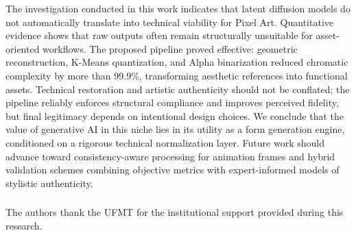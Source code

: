 \documentclass[runningheads]{llncs}
\begin{document}
The investigation conducted in this work indicates that latent diffusion models do not automatically translate into technical viability for Pixel Art. Quantitative evidence shows that raw outputs often remain structurally unsuitable for asset-oriented workflows. The proposed pipeline proved effective: geometric reconstruction, K-Means quantization, and Alpha binarization reduced chromatic complexity by more than 99.9\%, transforming aesthetic references into functional assets. Technical restoration and artistic authenticity should not be conflated; the pipeline reliably enforces structural compliance and improves perceived fidelity, but final legitimacy depends on intentional design choices. We conclude that the value of generative AI in this niche lies in its utility as a form generation engine, conditioned on a rigorous technical normalization layer. Future work should advance toward consistency-aware processing for animation frames and hybrid validation schemes combining objective metrics with expert-informed models of stylistic authenticity.

\begin{credits}
\subsubsection{\ackname} The authors thank the UFMT for the institutional support provided during this research.
\end{credits}

%
%
\footnotesize


\end{document}
